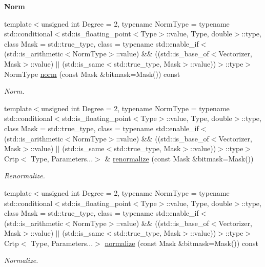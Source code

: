 \begin{Indent}{\bf Norm}\par
\begin{DoxyCompactItemize}
\item 
{\footnotesize template$<$unsigned int Degree = 2, typename Norm\-Type  = typename std\-::conditional$<$std\-::is\-\_\-floating\-\_\-point$<$\-Type$>$\-::value, Type, double$>$\-::type, class Mask  = std\-::true\-\_\-type, class  = typename std\-::enable\-\_\-if$<$(std\-::is\-\_\-arithmetic$<$\-Norm\-Type$>$\-::value) \&\& ((std\-::is\-\_\-base\-\_\-of$<$\-Vectorizer, Mask$>$\-::value) $|$$|$ (std\-::is\-\_\-same$<$std\-::true\-\_\-type, Mask$>$\-::value))$>$\-::type$>$ }\\Norm\-Type \hyperlink{classmagrathea_1_1AbstractNArray_a569c11a7a0374d2a1015d284663a8aaf}{norm} (const Mask \&bitmask=Mask()) const 
\begin{DoxyCompactList}\small\item\em Norm. \end{DoxyCompactList}\item 
{\footnotesize template$<$unsigned int Degree = 2, typename Norm\-Type  = typename std\-::conditional$<$std\-::is\-\_\-floating\-\_\-point$<$\-Type$>$\-::value, Type, double$>$\-::type, class Mask  = std\-::true\-\_\-type, class  = typename std\-::enable\-\_\-if$<$(std\-::is\-\_\-arithmetic$<$\-Norm\-Type$>$\-::value) \&\& ((std\-::is\-\_\-base\-\_\-of$<$\-Vectorizer, Mask$>$\-::value) $|$$|$ (std\-::is\-\_\-same$<$std\-::true\-\_\-type, Mask$>$\-::value))$>$\-::type$>$ }\\Crtp$<$ Type, Parameters...$>$ \& \hyperlink{classmagrathea_1_1AbstractNArray_a42854d836926ec9c23574bb9767078e3}{renormalize} (const Mask \&bitmask=Mask())
\begin{DoxyCompactList}\small\item\em Renormalize. \end{DoxyCompactList}\item 
{\footnotesize template$<$unsigned int Degree = 2, typename Norm\-Type  = typename std\-::conditional$<$std\-::is\-\_\-floating\-\_\-point$<$\-Type$>$\-::value, Type, double$>$\-::type, class Mask  = std\-::true\-\_\-type, class  = typename std\-::enable\-\_\-if$<$(std\-::is\-\_\-arithmetic$<$\-Norm\-Type$>$\-::value) \&\& ((std\-::is\-\_\-base\-\_\-of$<$\-Vectorizer, Mask$>$\-::value) $|$$|$ (std\-::is\-\_\-same$<$std\-::true\-\_\-type, Mask$>$\-::value))$>$\-::type$>$ }\\Crtp$<$ Type, Parameters...$>$ \hyperlink{classmagrathea_1_1AbstractNArray_a0361019ef75cd07ff560d5ce7760eaef}{normalize} (const Mask \&bitmask=Mask()) const 
\begin{DoxyCompactList}\small\item\em Normalize. \end{DoxyCompactList}\end{DoxyCompactItemize}
\end{Indent}
